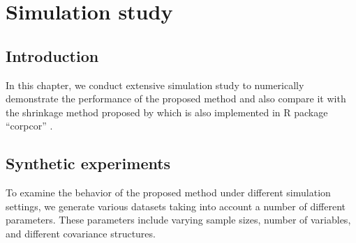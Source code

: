 \chapter{Simulation study}



\section{Introduction}
In this chapter, we conduct extensive simulation study to numerically demonstrate the performance of the proposed method and also compare it with the shrinkage method proposed by \cite{schafer2005shrinkage} which is also implemented in R package ``corpcor'' \citep{schaefer2013corpcor}.

\section{Synthetic experiments}
To examine the behavior of the proposed method under different simulation settings, we generate various datasets taking into account a number of different parameters. These parameters include varying sample sizes, number of variables, and different covariance structures.

